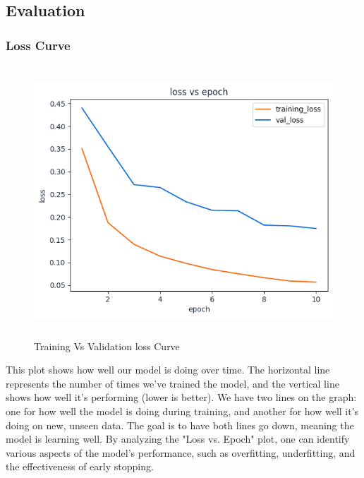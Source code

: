 \newpage
\subsection{Evaluation}
\subsubsection{Loss Curve}
\begin{figure}[ht]
    \centering
    \includegraphics[width= 5in, height =4in ]{img/lossVsAccuracy.png}
    \caption{{Training Vs Validation loss Curve}}
\end{figure}
\noindent This plot shows how well our model is doing over time. The horizontal line represents the number of times we've trained the model, and the vertical line shows how well it's performing (lower is better). We have two lines on the graph: one for how well the model is doing during training, and another for how well it's doing on new, unseen data. The goal is to have both lines go down, meaning the model is learning well. By analyzing the "Loss vs. Epoch" plot, one can identify various aspects of the model's performance, such as overfitting, underfitting, and the effectiveness of early stopping.

\newpage
